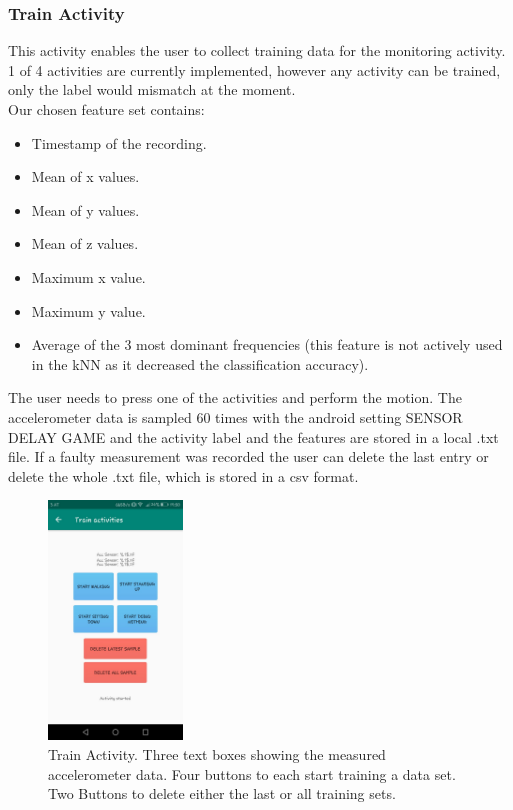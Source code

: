 \documentclass[12pt]{article}
\begin{document}
\pagebreak

\subsubsection{Train Activity} \label{sec:train} 
This activity enables the user to collect training data for the monitoring activity. 1 of 4 activities are currently implemented, however any activity can be trained, only the label would mismatch at the moment.
\\
Our chosen feature set contains:
\begin{itemize}
	\item Timestamp of the recording.
	\item Mean of x values.
	\item Mean of y values.
	\item Mean of z values.
	\item Maximum x value.
	\item Maximum y value.
	\item Average of the 3 most dominant frequencies (this feature is not actively used in the kNN as it decreased the classification accuracy).
\end{itemize}

The user needs to press one of the activities and perform the motion. The accelerometer data is sampled 60 times with the android setting SENSOR DELAY GAME and  the activity label and the features are stored in a local .txt file.
If a faulty measurement was recorded the user can delete the last entry or delete the whole .txt file, which is stored in a csv format.

\begin{figure}[h]
  \centering
  \includegraphics[width=135px]{images/train_activity}
  \caption{Train Activity. Three text boxes showing the measured accelerometer data. Four buttons to each start training a data set. Two Buttons to delete either the last or all training sets.}
\end{figure}
\end{document}
